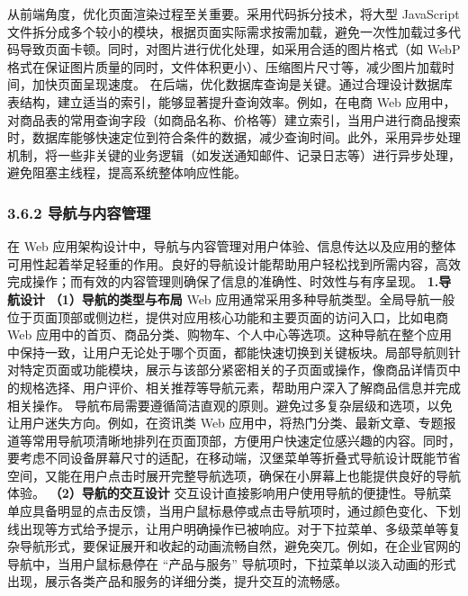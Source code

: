 从前端角度，优化页面渲染过程至关重要。采用代码拆分技术，将大型 JavaScript 文件拆分成多个较小的模块，根据页面实际需求按需加载，避免一次性加载过多代码导致页面卡顿。同时，对图片进行优化处理，如采用合适的图片格式（如 WebP 格式在保证图片质量的同时，文件体积更小）、压缩图片尺寸等，减少图片加载时间，加快页面呈现速度。 在后端，优化数据库查询是关键。通过合理设计数据库表结构，建立适当的索引，能够显著提升查询效率。例如，在电商 Web 应用中，对商品表的常用查询字段（如商品名称、价格等）建立索引，当用户进行商品搜索时，数据库能够快速定位到符合条件的数据，减少查询时间。此外，采用异步处理机制，将一些非关键的业务逻辑（如发送通知邮件、记录日志等）进行异步处理，避免阻塞主线程，提高系统整体响应性能。 \subsubsection{3.6.2 导航与内容管理}\label{ux5bfcux822aux4e0eux5185ux5bb9ux7ba1ux7406} 在 Web 应用架构设计中，导航与内容管理对用户体验、信息传达以及应用的整体可用性起着举足轻重的作用。良好的导航设计能帮助用户轻松找到所需内容，高效完成操作；而有效的内容管理则确保了信息的准确性、时效性与有序呈现。 \textbf{1.导航设计} \textbf{（1）导航的类型与布局} Web 应用通常采用多种导航类型。全局导航一般位于页面顶部或侧边栏，提供对应用核心功能和主要页面的访问入口，比如电商 Web 应用中的首页、商品分类、购物车、个人中心等选项。这种导航在整个应用中保持一致，让用户无论处于哪个页面，都能快速切换到关键板块。局部导航则针对特定页面或功能模块，展示与该部分紧密相关的子页面或操作，像商品详情页中的规格选择、用户评价、相关推荐等导航元素，帮助用户深入了解商品信息并完成相关操作。 导航布局需要遵循简洁直观的原则。避免过多复杂层级和选项，以免让用户迷失方向。例如，在资讯类 Web 应用中，将热门分类、最新文章、专题报道等常用导航项清晰地排列在页面顶部，方便用户快速定位感兴趣的内容。同时，要考虑不同设备屏幕尺寸的适配，在移动端，汉堡菜单等折叠式导航设计既能节省空间，又能在用户点击时展开完整导航选项，确保在小屏幕上也能提供良好的导航体验。 \textbf{（2）导航的交互设计} 交互设计直接影响用户使用导航的便捷性。导航菜单应具备明显的点击反馈，当用户鼠标悬停或点击导航项时，通过颜色变化、下划线出现等方式给予提示，让用户明确操作已被响应。对于下拉菜单、多级菜单等复杂导航形式，要保证展开和收起的动画流畅自然，避免突兀。例如，在企业官网的导航中，当用户鼠标悬停在 ``产品与服务'' 导航项时，下拉菜单以淡入动画的形式出现，展示各类产品和服务的详细分类，提升交互的流畅感。 